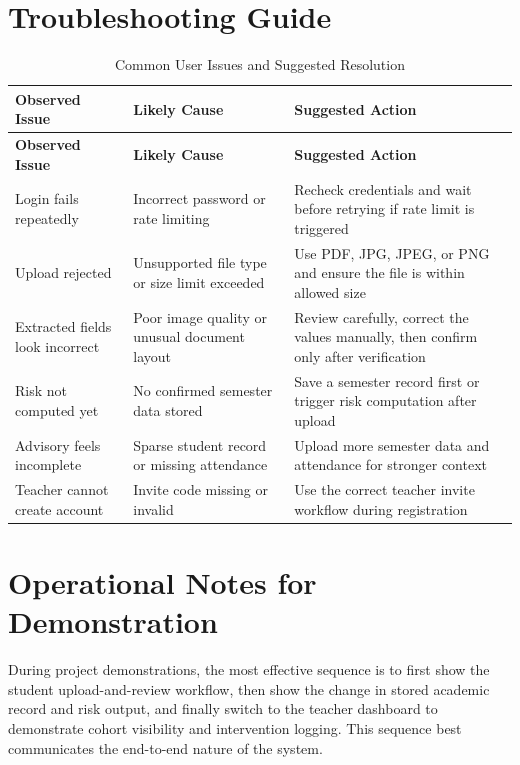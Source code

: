 \section{Troubleshooting Guide}
\begin{longtable}{p{}p{}p{}}
\caption{Common User Issues and Suggested Resolution}\\
\toprule
\textbf{Observed Issue} & \textbf{Likely Cause} & \textbf{Suggested Action} \\
\midrule
\endfirsthead
\toprule
\textbf{Observed Issue} & \textbf{Likely Cause} & \textbf{Suggested Action} \\
\midrule
\endhead
Login fails repeatedly & Incorrect password or rate limiting & Recheck credentials and wait before retrying if rate limit is triggered \\
Upload rejected & Unsupported file type or size limit exceeded & Use PDF, JPG, JPEG, or PNG and ensure the file is within allowed size \\
Extracted fields look incorrect & Poor image quality or unusual document layout & Review carefully, correct the values manually, then confirm only after verification \\
Risk not computed yet & No confirmed semester data stored & Save a semester record first or trigger risk computation after upload \\
Advisory feels incomplete & Sparse student record or missing attendance & Upload more semester data and attendance for stronger context \\
Teacher cannot create account & Invite code missing or invalid & Use the correct teacher invite workflow during registration \\
\bottomrule
\end{longtable}

\section{Operational Notes for Demonstration}
During project demonstrations, the most effective sequence is to first show the student upload-and-review workflow, then show the change in stored academic record and risk output, and finally switch to the teacher dashboard to demonstrate cohort visibility and intervention logging. This sequence best communicates the end-to-end nature of the system.
